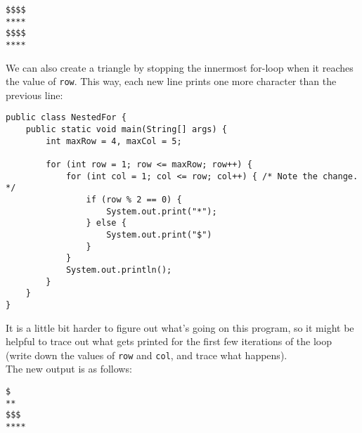\begin{lstlisting}
$$$$
****
$$$$
****
\end{lstlisting}


We can also create a triangle by stopping the innermost for-loop when it reaches the value of \verb!row!. This way, each new line prints one more character than the previous line:

\begin{lstlisting}
public class NestedFor {
	public static void main(String[] args) {
		int maxRow = 4, maxCol = 5;

		for (int row = 1; row <= maxRow; row++) {
			for (int col = 1; col <= row; col++) { /* Note the change. */
				if (row % 2 == 0) {
				    System.out.print("*");
				} else {
				    System.out.print("$")
				}
			}
			System.out.println();
		}
	}
}
\end{lstlisting}

It is a little bit harder to figure out what's going on this program, so it might be helpful to trace out what gets printed for the first few iterations of the loop (write down the values of \verb!row! and \verb!col!, and trace what happens).\\


The new output is as follows:

\begin{lstlisting}
$
**
$$$
****
\end{lstlisting}